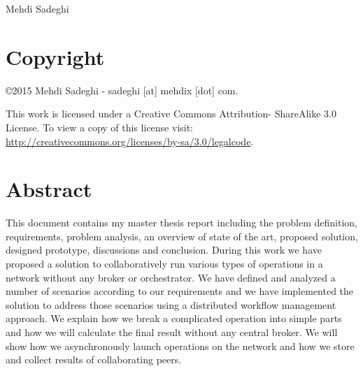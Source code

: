 \documentclass[12pt, a4paper, oneside]{report}
\newcounter{chapter_count}
\begin{document}
Mehdi Sadeghi

\chapter*{Copyright}
\noindent
\begin{flushleft}
\copyright 2015 Mehdi Sadeghi - sadeghi [at] mehdix [dot] com.
 
This work is licensed under a Creative Commons Attribution- ShareAlike 3.0 License.
To view a copy of this license visit:
\url{http://creativecommons.org/licenses/by-sa/3.0/legalcode}.
\end{flushleft}

\chapter*{Abstract}
This document contains my master thesis report including the problem definition, requirements, problem analysis,
an overview of state of the art, proposed solution, designed prototype, discussions and conclusion.
During this work we have proposed a solution to collaboratively run various types of operations in a network without any broker or orchestrator. 
We have defined and analyzed a number of scenarios according to our requirements 
and we have implemented the solution to address those scenarios using a distributed workflow management approach. We explain how
we break a complicated operation into simple parts and how we will calculate the final result without any central broker. We will show how
we asynchronously launch operations on the network and how we store and collect results of collaborating peers.


\listoffigures

\tableofcontents
\newpage





\printbibliography[heading=bibintoc, title={References}]
\end{document}
